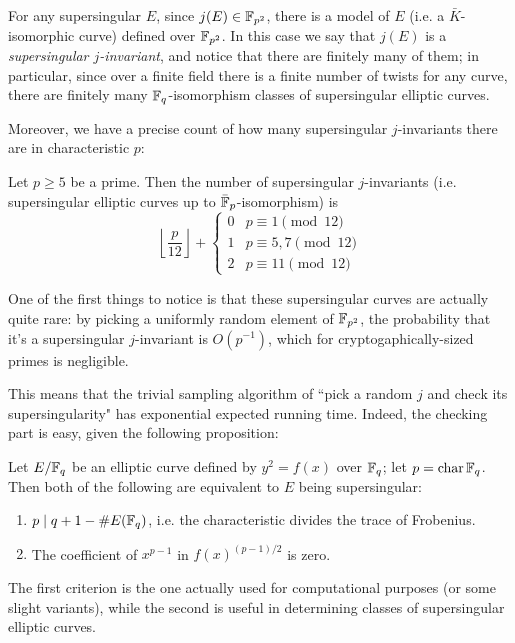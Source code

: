 For any supersingular $E$, since $j(E)\in\mathbb{F}_{p^2}$, there is a model of $E$ (i.e. a $\bar K$-isomorphic curve) defined over $\mathbb{F}_{p^2}$. In this case we say that $j(E)$ is a \emph{supersingular $j$-invariant}, and notice that there are finitely many of them; in particular, since over a finite field there is a finite number of twists for any curve, there are finitely many $\mathbb{F}_q$-isomorphism classes of supersingular elliptic curves.

Moreover, we have a precise count of how many supersingular $j$-invariants there are in characteristic $p$:
\begin{theorem}
    Let $p\ge5$ be a prime. Then the number of supersingular $j$-invariants (i.e. supersingular elliptic curves up to $\bar{\mathbb{F}}_p$-isomorphism) is
    $$\left\lfloor \frac{p}{12} \right\rfloor + \begin{cases}
    0 & p\equiv1\pmod{12}\\
    1 & p\equiv5,7\pmod{12}\\
    2 & p\equiv11\pmod{12}
    \end{cases}$$
\end{theorem}

One of the first things to notice is that these supersingular curves are actually quite rare: by picking a uniformly random element of $\mathbb{F}_{p^2}$, the probability that it's a supersingular $j$-invariant is $O(p^{-1})$, which for cryptogaphically-sized primes is negligible.

This means that the trivial sampling algorithm of ``pick a random $j$ and check its supersingularity" has exponential expected running time. Indeed, the checking part is easy, given the following proposition:
\begin{proposition}
    Let $E/\mathbb{F}_q$ be an elliptic curve defined by $y^2=f(x)$ over $\mathbb{F}_q$; let $p=\operatorname{char}\mathbb{F}_q$. Then both of the following are equivalent to $E$ being supersingular:
    \begin{enumerate}
        \item $p\mid q+1-\# E(\mathbb{F}_q)$, i.e. the characteristic divides the trace of Frobenius.
        \item The coefficient of $x^{p-1}$ in $f(x)^{(p-1)/2}$ is zero.
    \end{enumerate}
\end{proposition}

The first criterion is the one actually used for computational purposes (or some slight variants), while the second is useful in determining classes of supersingular elliptic curves.

